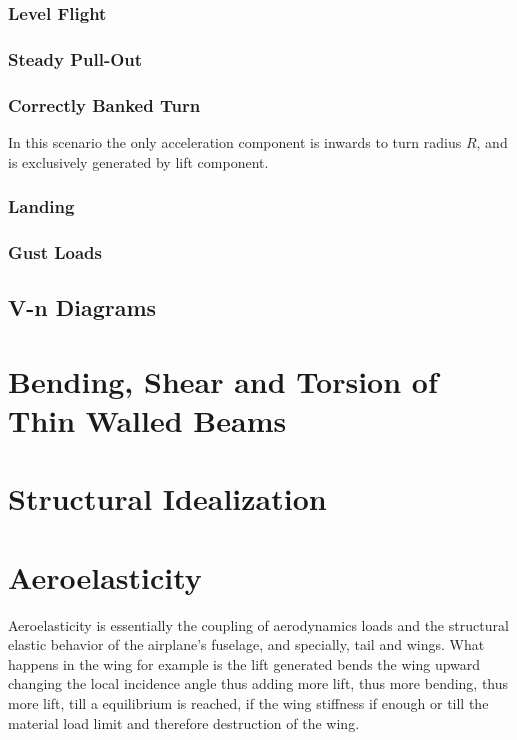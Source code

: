 \subsubsection{Level Flight}

\subsubsection{Steady Pull-Out}

\subsubsection{Correctly Banked Turn}
In this scenario the only acceleration component is inwards to turn radius $R$, and is exclusively generated by lift component.


\subsubsection{Landing}

\subsubsection{Gust Loads}



\subsection{V-n Diagrams}










\newpage
\section{Bending, Shear and Torsion of Thin Walled Beams}










\newpage
\section{Structural Idealization}







\newpage
\section{Aeroelasticity}
Aeroelasticity is essentially the coupling of aerodynamics loads and the structural elastic behavior of the airplane's fuselage, and specially, tail and wings.
What happens in the wing for example is the lift generated bends the wing upward changing the local incidence angle thus adding more lift, thus more bending,
thus more lift, till a equilibrium is reached, if the wing stiffness if enough or till the material load limit and therefore destruction of the wing.

